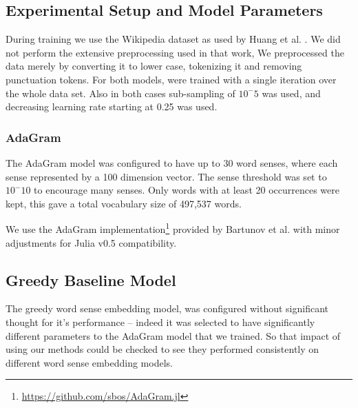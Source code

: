 \documentclass{sig-alternate}
\begin{document}
\subsection{Experimental Setup and Model Parameters}
During training we use the Wikipedia dataset as used by Huang et al. \parencite{Huang2012}.
We did not perform the extensive preprocessing used in that work, 
We preprocessed the data merely by converting it to lower case, tokenizing it and removing punctuation tokens.
For both models, were trained with a single iteration over the whole data set.
Also in both cases sub-sampling of $10^-5$ was used, and decreasing learning rate starting at 0.25 was used.


\subsubsection{AdaGram}
The AdaGram model was configured to have up to 30 word senses, where each sense represented by a 100 dimension vector. The sense threshold was set to $10^-10$ to encourage many senses.
Only words with at least 20 occurrences were kept, this gave a total vocabulary size of 497,537 words.

We use the AdaGram \parencite{AdaGrams} implementation\footnote{\url{https://github.com/sbos/AdaGram.jl}} provided by Bartunov et al. with minor adjustments for Julia \parencite{Julia} v0.5 compatibility.



\subsection{Greedy Baseline Model}
The greedy word sense embedding model, was configured without significant thought for it's performance -- indeed it was selected to have significantly different parameters to the AdaGram model that we trained. So that impact of using our methods could be checked to see they performed consistently on different word sense embedding models.
\end{document}
